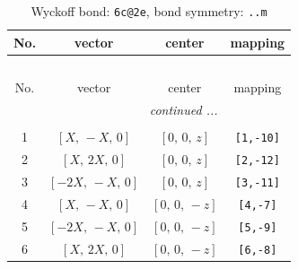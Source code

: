 \documentclass[fleqn,8pt]{jsarticle}
\begin{document}
\renewcommand{\arraystretch}{1.2}
\begin{longtable}{cccc}
\caption{Wyckoff bond: {\tt 6c@2e}, bond symmetry: {\tt ..m}}
 \\
 \hline \hline
No. & vector & center & mapping \\ \hline \endfirsthead

\multicolumn{3}{l}{\tablename\ \thetable{}} \\
 \hline \hline
No. & vector & center & mapping \\ \hline \endhead

 \hline \hline
\multicolumn{3}{r}{\footnotesize\it continued ...} \\ \endfoot

 \hline \hline
\multicolumn{3}{r}{} \\ \endlastfoot

1 & $\left[ X,\, - X,\, 0 \right]$ & $\left[ 0,\, 0,\, z \right]$ & {\tt [1,-10]} \\ \hline
2 & $\left[ X,\, 2 X,\, 0 \right]$ & $\left[ 0,\, 0,\, z \right]$ & {\tt [2,-12]} \\ \hline
3 & $\left[ - 2 X,\, - X,\, 0 \right]$ & $\left[ 0,\, 0,\, z \right]$ & {\tt [3,-11]} \\ \hline
4 & $\left[ X,\, - X,\, 0 \right]$ & $\left[ 0,\, 0,\, - z \right]$ & {\tt [4,-7]} \\ \hline
5 & $\left[ - 2 X,\, - X,\, 0 \right]$ & $\left[ 0,\, 0,\, - z \right]$ & {\tt [5,-9]} \\ \hline
6 & $\left[ X,\, 2 X,\, 0 \right]$ & $\left[ 0,\, 0,\, - z \right]$ & {\tt [6,-8]} \\
\end{longtable}
\renewcommand{\arraystretch}{1.2}
\end{document}
